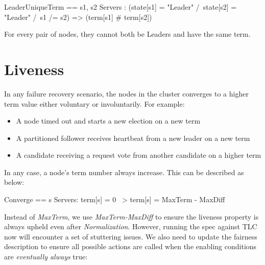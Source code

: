 \begin{tla}
LeaderUniqueTerm ==
    \A s1, s2 \in Servers :
        (state[s1] = "Leader" /\ state[s2] = "Leader" /\ s1 /= s2) => (term[s1] # term[s2])
\end{tla}
\begin{tlatex}
%
%
\end{tlatex}
\newline

For every pair of nodes, they cannot both be Leaders and have the same
term.

\section{Liveness}

In any failure recovery scenario, the nodes in the cluster converges to a higher
term value either voluntary or involuntarily. For example: 
\begin{itemize}
    \item A node timed out and starts a new election on a new term 
    \item A partitioned follower receives heartbeat from a new leader on a new term
    \item A candidate receiving a request vote from another candidate on a higher term
\end{itemize}

In any case, a node's term number always increase. This can be described as below:\newline
\begin{tla}
Converge ==
    \A s \in Servers:
        term[s] = 0 ~> term[s] = MaxTerm - MaxDiff
\end{tla}
\begin{tlatex}
%
%
\end{tlatex}
\newline

Instead of \textit{MaxTerm}, we use \textit{MaxTerm-MaxDiff} to ensure the
liveness property is always upheld even after \textit{Normalization}. However,
running the spec against TLC now will encounter a set of stuttering issues. We
also need to update the fairness description to ensure all possible actions are
called when the enabling conditions are \textit{eventually always} true:\newline


